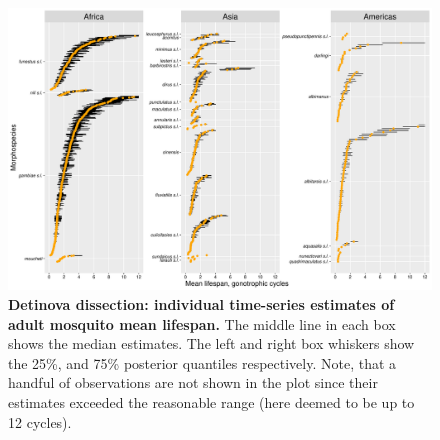 \documentclass[12pt]{article}
\begin{document}
\begin{figure}[h]
	\centerline{\includegraphics[width=1.3\textwidth]{./Figure_files/detinova_individual_lifespan_no_insecticide.pdf}}
	\caption{\textbf{Detinova dissection: individual time-series estimates of adult mosquito mean lifespan.} The middle line in each box shows the median estimates. The left and right box whiskers show the 25\%, and 75\% posterior quantiles respectively. Note, that a handful of observations are not shown in the plot since their estimates exceeded the reasonable range (here deemed to be up to 12 cycles).}
	\label{fig:detinova_lifespan_individual}
\end{figure}
\end{document}
